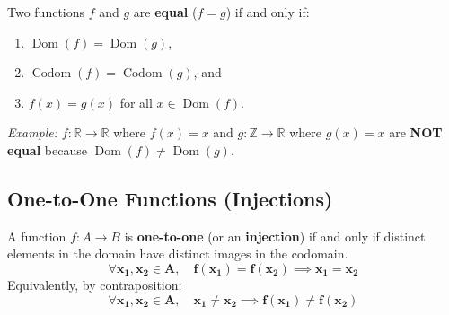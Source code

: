 \documentclass[11pt,a4paper]{article}
\begin{document}
\begin{theorembox}
Two functions $f$ and $g$ are \textbf{equal} ($f = g$) if and only if:
\begin{enumerate}
    \item $\operatorname{Dom}(f) = \operatorname{Dom}(g)$,
    \item $\operatorname{Codom}(f) = \operatorname{Codom}(g)$, and
    \item $f(x) = g(x)$ for all $x \in \operatorname{Dom}(f)$.
\end{enumerate}
\textit{Example:} $f: \mathbb{R} \to \mathbb{R}$ where $f(x) = x$ and $g: \mathbb{Z} \to \mathbb{R}$ where $g(x) = x$ are \textbf{NOT equal} because $\operatorname{Dom}(f) \neq \operatorname{Dom}(g)$.
\end{theorembox}

\subsection{One-to-One Functions (Injections)}

\begin{defbox}
A function $f: A \to B$ is \textbf{one-to-one} (or an \textbf{injection}) if and only if distinct elements in the domain have distinct images in the codomain.
\[
\mathbf{\forall x_1, x_2 \in A, \quad f(x_1) = f(x_2) \implies x_1 = x_2}
\]
Equivalently, by contraposition:
\[
\mathbf{\forall x_1, x_2 \in A, \quad x_1 \neq x_2 \implies f(x_1) \neq f(x_2)}
\]
\end{defbox}
\end{document}
